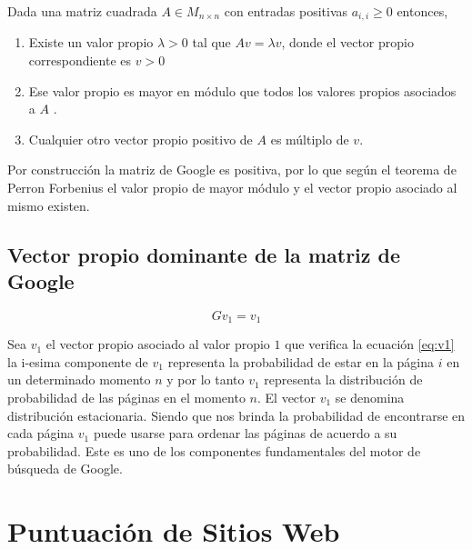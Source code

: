\documentclass{article}
\begin{document}

Dada una matriz cuadrada $A\in M_{n \times n}$ con entradas positivas $a_{i,i} \geqslant 0$ entonces, 
\begin{enumerate}
\item Existe un valor propio $\lambda > 0$ tal que $A v= \lambda v$, donde el vector propio correspondiente es $v > 0$ 
\item Ese valor propio es mayor en módulo que todos los valores propios asociados a $A$ .
\item Cualquier otro vector  propio positivo de $A$ es múltiplo de $v$.
\end{enumerate}

Por construcción la matriz de Google es positiva, por lo que según el teorema de Perron Forbenius el valor propio de mayor módulo y el vector propio asociado al mismo existen.

\subsection{Vector propio dominante de la matriz de Google}

\begin{equation} \label{eq:v1}
Gv_{1} = v_{1}
\end{equation}

Sea $v_{1}$ el vector propio asociado al valor propio $1$ que verifica la ecuación \ref{eq:v1}  la i-esima componente de $v_{1}$ representa la probabilidad de estar en la página $i$ en un determinado momento $n$ y por lo tanto  $v_{1}$ representa la distribución de probabilidad de las páginas en el momento $n$. El vector $v_{1}$ se denomina distribución estacionaria. Siendo que nos brinda la probabilidad de encontrarse en cada página $v_{1}$ puede usarse para ordenar las páginas de acuerdo a su probabilidad. Este es uno de los componentes fundamentales del motor de búsqueda de Google.


\section{Puntuación de Sitios Web}
\end{document}
